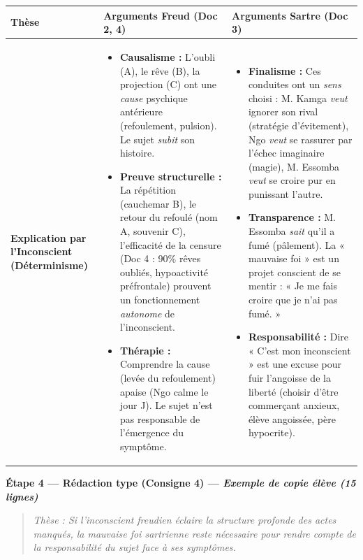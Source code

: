 \documentclass[11pt]{article}
\begin{document}
\begin{exoresolu}
\begin{center}
\begin{tabularx}{\linewidth}{|>{\bfseries}X|X|X|}\hline
\textbf{Thèse} & \textbf{Arguments Freud (Doc 2, 4)} & \textbf{Arguments Sartre (Doc 3)} \\ \hline
\textbf{Explication par l'Inconscient (Déterminisme)} & \begin{itemize}\item \textbf{Causalisme :} L'oubli (A), le rêve (B), la projection (C) ont une \emph{cause} psychique antérieure (refoulement, pulsion). Le sujet \emph{subit} son histoire.
\item \textbf{Preuve structurelle :} La répétition (cauchemar B), le retour du refoulé (nom A, souvenir C), l'efficacité de la censure (Doc 4 : 90\% rêves oubliés, hypoactivité préfrontale) prouvent un fonctionnement \emph{autonome} de l'inconscient.
\item \textbf{Thérapie :} Comprendre la cause (levée du refoulement) apaise (Ngo calme le jour J). Le sujet n'est pas responsable de l'émergence du symptôme.
\end{itemize} & \begin{itemize}\item \textbf{Finalisme :} Ces conduites ont un \emph{sens} choisi : M. Kamga \emph{veut} ignorer son rival (stratégie d'évitement), Ngo \emph{veut} se rassurer par l'échec imaginaire (magie), M. Essomba \emph{veut} se croire pur en punissant l'autre.
\item \textbf{Transparence :} M. Essomba \emph{sait} qu'il a fumé (pâlement). La « mauvaise foi » est un projet conscient de se mentir : « Je me fais croire que je n'ai pas fumé. »
\item \textbf{Responsabilité :} Dire « C'est mon inconscient » est une excuse pour fuir l'angoisse de la liberté (choisir d'être commerçant anxieux, élève angoissée, père hypocrite).
\end{itemize} \\ \hline
\end{tabularx}
\end{center}

\textbf{Étape 4 — Rédaction type (Consigne 4) — \emph{Exemple de copie élève (15 lignes)}}

\begin{quote}
\emph{Thèse : Si l'inconscient freudien éclaire la structure profonde des actes manqués, la mauvaise foi sartrienne reste nécessaire pour rendre compte de la responsabilité du sujet face à ses symptômes.}


\end{quote}
\end{exoresolu}
\end{document}
